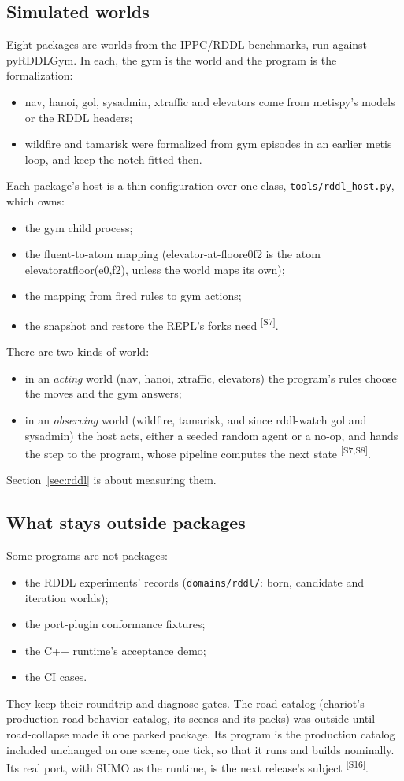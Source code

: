 \documentclass[11pt]{article}
\newcommand{\tool}[1]{{\ttfamily\begingroup\def\_{\textunderscore\allowbreak}#1\endgroup}}
\newcommand{\src}[1]{\textsuperscript{[#1]}}
\begin{document}
\subsection{Simulated worlds}
Eight packages are worlds from the IPPC/RDDL benchmarks, run against
pyRDDLGym. In each, the gym is the world and the program is the
formalization:
\begin{itemize}[nosep]
\item nav, hanoi, gol, sysadmin, xtraffic and elevators come from
  metispy's models or the RDDL headers;
\item wildfire and tamarisk were formalized from gym episodes in an
  earlier metis loop, and keep the notch fitted then.
\end{itemize}
Each package's host is a thin configuration over one class,
\texttt{tools/rddl\_host.py}, which owns:
\begin{itemize}[nosep]
\item the gym child process;
\item the fluent-to-atom mapping (\tool{elevator-at-floor\_\_\_e0\_\_f2}
  is the atom \tool{elevator\_at\_floor(e0,f2)}, unless the world maps
  its own);
\item the mapping from fired rules to gym actions;
\item the snapshot and restore the REPL's forks need \src{S7}.
\end{itemize}
There are two kinds of world:
\begin{itemize}[nosep]
\item in an \emph{acting} world (nav, hanoi, xtraffic, elevators) the
  program's rules choose the moves and the gym answers;
\item in an \emph{observing} world (wildfire, tamarisk, and since
  rddl-watch gol and sysadmin) the host acts, either a seeded random
  agent or a no-op, and hands the step to the program, whose pipeline
  computes the next state \src{S7,S8}.
\end{itemize}
Section~\ref{sec:rddl} is about measuring them.

\subsection{What stays outside packages}
Some programs are not packages:
\begin{itemize}[nosep]
\item the RDDL experiments' records (\texttt{domains/rddl/}: born,
  candidate and iteration worlds);
\item the port-plugin conformance fixtures;
\item the C++ runtime's acceptance demo;
\item the CI cases.
\end{itemize}
They keep their roundtrip and diagnose gates. The road catalog
(chariot's production road-behavior catalog, its scenes and its packs) was
outside until road-collapse made it one parked package. Its program is
the production catalog included unchanged on one scene, one tick, so that
it runs and builds nominally. Its real port, with SUMO as the runtime, is
the next release's subject \src{S16}.
\end{document}
